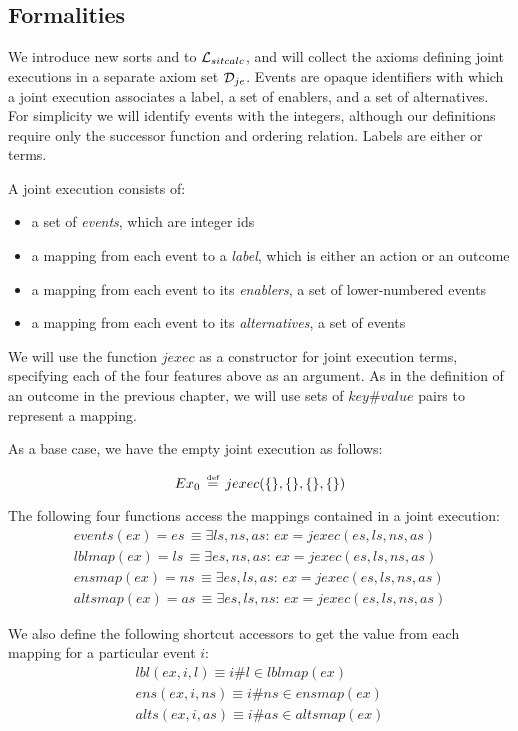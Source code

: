 \subsection{Formalities}

We introduce new sorts and  to $\mathcal{L}_{sitcalc}$,
and will collect the axioms defining joint executions in a separate
axiom set $\mathcal{D}_{je}$. Events are opaque identifiers with which a
joint execution associates a label, a set of enablers, and a set of
alternatives. For simplicity we will identify events with the integers,
although our definitions require only the successor function and ordering
relation. Labels are either  or  terms.

A joint execution consists of:

\begin{itemize}
\item a set of \emph{events}, which are integer ids 
\item a mapping from each event to a \emph{label}, which is either an action
or an outcome 
\item a mapping from each event to its \emph{enablers}, a set of lower-numbered
events 
\item a mapping from each event to its \emph{alternatives}, a set of events 
\end{itemize}
We will use the function $jexec$ as a constructor for joint execution
terms, specifying each of the four features above as an argument.
As in the definition of an outcome in the previous chapter, we will
use sets of $key\#value$ pairs to represent a mapping.

As a base case, we have the empty joint execution as follows:

\[
Ex_{0}\,\stackrel{\mbox{\tiny def}}{=}\, jexec(\{\},\{\},\{\},\{\})\]


The following four functions access the mappings contained in a joint
execution:\begin{gather*}
events(ex)=es\,\equiv\exists ls,ns,as:\, ex=jexec(es,ls,ns,as)\\
lblmap(ex)=ls\,\equiv\exists es,ns,as:\, ex=jexec(es,ls,ns,as)\\
ensmap(ex)=ns\,\equiv\exists es,ls,as:\, ex=jexec(es,ls,ns,as)\\
altsmap(ex)=as\,\equiv\exists es,ls,ns:\, ex=jexec(es,ls,ns,as)\end{gather*}


We also define the following shortcut accessors to get the value from
each mapping for a particular event $i$:\begin{gather*}
lbl(ex,i,l)\equiv i\#l\in lblmap(ex)\\
ens(ex,i,ns)\equiv i\#ns\in ensmap(ex)\\
alts(ex,i,as)\equiv i\#as\in altsmap(ex)\end{gather*}


